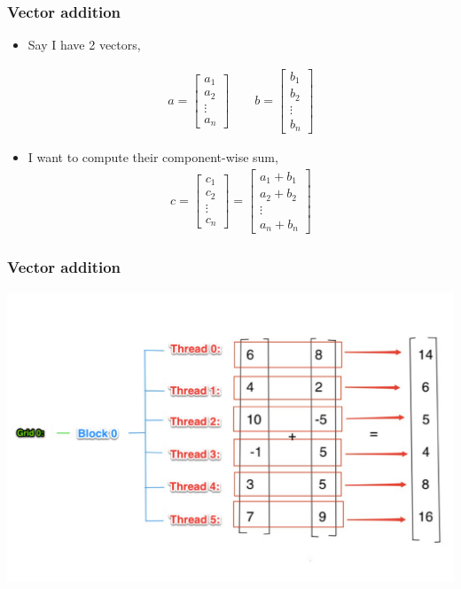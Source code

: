 \documentclass[handout]{beamer}
\numberwithin{equation}{section}
\begin{document}
\begin{frame}
\frametitle{Vector addition}


\begin{itemize}
\item Say I have 2 vectors,


\begin{align*}
a = \begin{bmatrix} a_1 \\ a_2 \\ \vdots \\ a_n \end{bmatrix} \qquad b = \begin{bmatrix} b_1 \\ b_2 \\ \vdots \\ b_n  \end{bmatrix}
\end{align*}

\pause \item I want to compute their component-wise sum,
\begin{align*}
c = \begin{bmatrix} c_1 \\ c_2 \\ \vdots \\ c_n \end{bmatrix} = \begin{bmatrix} a_1 + b_1 \\ a_2 + b_2 \\ \vdots \\ a_n + b_n  \end{bmatrix}
\end{align*}

\end{itemize}
\end{frame}

\begin{frame}
\frametitle{Vector addition}
\begin{center}
\includegraphics[scale=.25]{../../fig/vadd1.pdf}
\end{center}
\end{frame}
\end{document}
